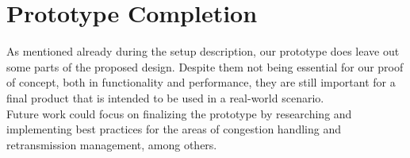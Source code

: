 \section{Prototype Completion}\label{sec:prototype_completion}
As mentioned already during the setup description, our prototype 
does leave out some parts of the proposed design.
Despite them not being essential for our proof of concept,
both in functionality and performance, they are still important
for a final product that is intended to be used in a real-world
scenario.
\\
Future work could focus on finalizing the prototype by researching 
and implementing best practices for the areas of congestion handling
and retransmission management, among others.
